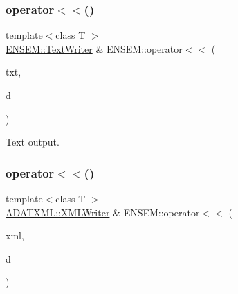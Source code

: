 \mbox{\label{group__primscalar_gaa851ed6964c4ac3ce548dfb95692f221}} 
\subsubsection{\texorpdfstring{operator$<$$<$()}{operator<<()}\hspace{0.1cm}{\footnotesize\ttfamily [2/4]}}
{\footnotesize\ttfamily template$<$class T $>$ \\
\mbox{\hyperlink{classENSEM_1_1TextWriter}{E\+N\+S\+E\+M\+::\+Text\+Writer}} \& E\+N\+S\+E\+M\+::operator$<$$<$ (\begin{DoxyParamCaption}\item[{\mbox{\hyperlink{classENSEM_1_1TextWriter}{E\+N\+S\+E\+M\+::\+Text\+Writer}} \&}]{txt,  }\item[{const \mbox{\hyperlink{classENSEM_1_1PScalar}{P\+Scalar}}$<$ T $>$ \&}]{d }\end{DoxyParamCaption})\hspace{0.3cm}{\ttfamily [inline]}}



Text output. 

\mbox{\label{group__primscalar_ga7c71fa022421c2fa564d74338851def4}} 
\subsubsection{\texorpdfstring{operator$<$$<$()}{operator<<()}\hspace{0.1cm}{\footnotesize\ttfamily [3/4]}}
{\footnotesize\ttfamily template$<$class T $>$ \\
\mbox{\hyperlink{classADATXML_1_1XMLWriter}{A\+D\+A\+T\+X\+M\+L\+::\+X\+M\+L\+Writer}} \& E\+N\+S\+E\+M\+::operator$<$$<$ (\begin{DoxyParamCaption}\item[{\mbox{\hyperlink{classADATXML_1_1XMLWriter}{A\+D\+A\+T\+X\+M\+L\+::\+X\+M\+L\+Writer}} \&}]{xml,  }\item[{const \mbox{\hyperlink{classENSEM_1_1PScalar}{P\+Scalar}}$<$ T $>$ \&}]{d }\end{DoxyParamCaption})\hspace{0.3cm}{\ttfamily [inline]}}



